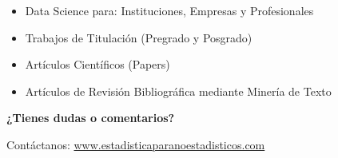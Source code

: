 \documentclass[
]{book}
\providecommand{\tightlist}{%
  \setlength{\itemsep}{0pt}\setlength{\parskip}{0pt}}
\begin{document}
\begin{itemize}
\tightlist
\item
  Data Science para: Instituciones, Empresas y Profesionales
\item
  Trabajos de Titulación (Pregrado y Posgrado)
\item
  Artículos Científicos (Papers)
\item
  Artículos de Revisión Bibliográfica mediante Minería de Texto
\end{itemize}

\textbf{¿Tienes dudas o comentarios?}

Contáctanos: \href{https://www.estadisticaparanoestadisticos.com}{www.estadisticaparanoestadisticos.com}

\backmatter
  
\end{document}
